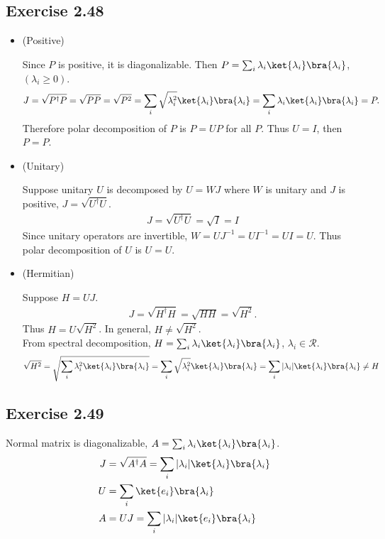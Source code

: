 \documentclass[a4paper,12pt]{article}
\begin{document}
\subsection*{Exercise 2.48}
\begin{itemize}
    \item (Positive)
    
 Since $P$ is positive, it is diagonalizable. Then $P = \sum_i \lambda_i \ket{\lambda_i}\bra{\lambda_i}$, $(\lambda_i \geq 0)$.
\begin{align*}
	J = \sqrt{P^\dagger P} = \sqrt{P P} = \sqrt{P^2} = \sum_i \sqrt{\lambda_i^2} \ket{\lambda_i}\bra{\lambda_i} = \sum_i \lambda_i \ket{\lambda_i}\bra{\lambda_i} = P.
\end{align*}
 Therefore polar decomposition of $P$ is $P = UP$ for all $P$.
 Thus $U = I$, then $P = P$.
    \item (Unitary)

Suppose unitary $U$ is decomposed by $U = WJ$ where $W$ is unitary and $J$ is positive, $J = \sqrt{U^\dagger U}$.
\begin{align*}
	J = \sqrt{U^\dagger U} = \sqrt{I} = I
\end{align*}
Since unitary operators are invertible, $W = UJ^{-1} = UI^{-1} = UI = U$.
Thus polar decomposition of $U$ is $U = U$.
    \item (Hermitian)

Suppose $H = UJ$.
\begin{align*}
	J = \sqrt{H^\dagger H} = \sqrt{HH} = \sqrt{H^2}.
\end{align*}
Thus $H = U\sqrt{H^2}$.
In general, $H \neq \sqrt{H^2}$.
\\From spectral decomposition, $H = \sum_i \lambda_i \ket{\lambda_i}\bra{\lambda_i}$, $\lambda_i \in \mathcal{R}$.
	\begin{align*}
		 \sqrt{H^2} = \sqrt{ \sum_i \lambda_i^2 \ket{\lambda_i}\bra{\lambda_i} }
		 =
 		\sum_i
 			\sqrt{
 				\lambda_i^2
			} \ket{\lambda_i}\bra{\lambda_i}
		= \sum_i | \lambda_i | \ket{\lambda_i}\bra{\lambda_i} \neq H
	\end{align*}
\end{itemize}

	



\subsection*{Exercise 2.49}
Normal matrix is diagonalizable, $A = \sum_i \lambda_i \ket{\lambda_i}\bra{\lambda_i}$.
\begin{align*}
	J &= \sqrt{A^\dagger A} = \sum_i | \lambda_i | \ket{\lambda_i}\bra{\lambda_i}\\
	U &= \sum_i \ket{e_i}\bra{\lambda_i}\\
	A &= UJ = \sum_i |\lambda_i| \ket{e_i}\bra{\lambda_i}
\end{align*}
\end{document}
